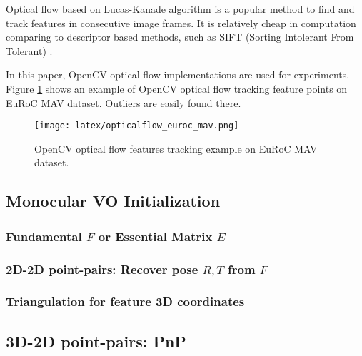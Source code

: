 \documentclass[10pt,twocolumn,letterpaper]{article}
\begin{document}
Optical flow based on Lucas-Kanade algorithm \cite{Lucas-1981-15101} is a popular method to find and track features in consecutive image frames. It is relatively cheap in computation comparing to descriptor based methods, such as SIFT (Sorting Intolerant From Tolerant) \cite{Lowe04distinctiveimage}. 

In this paper, OpenCV optical flow implementations \cite{OpenCV_optical_flow} are used for experiments. Figure \ref{fig:figure2} shows an example of OpenCV optical flow tracking feature points on EuRoC MAV dataset. Outliers are easily found there. 

 
\begin{figure}[h]
\texttt{[image: latex/opticalflow\_euroc\_mav.png]}
\caption{OpenCV optical flow features tracking example on EuRoC MAV dataset.}
\label{fig:figure2}
\end{figure}

\subsection{Monocular VO Initialization}



\subsubsection{Fundamental $F$ or Essential Matrix $E$}

\subsubsection{2D-2D point-pairs: Recover pose $R, T$ from $F$}

\subsubsection{Triangulation for feature 3D coordinates}

\subsection{3D-2D point-pairs: PnP}
\end{document}

